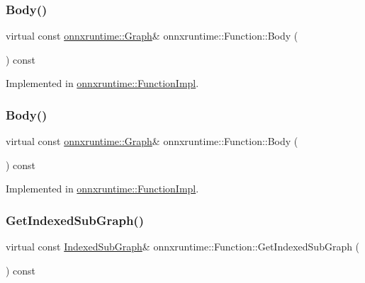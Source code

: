 \subsubsection{\texorpdfstring{Body()}{Body()}\hspace{0.1cm}{\footnotesize\ttfamily [1/2]}}
{\footnotesize\ttfamily virtual const \mbox{\hyperlink{classonnxruntime_1_1Graph}{onnxruntime\+::\+Graph}}\& onnxruntime\+::\+Function\+::\+Body (\begin{DoxyParamCaption}{ }\end{DoxyParamCaption}) const\hspace{0.3cm}{\ttfamily [pure virtual]}}



Implemented in \mbox{\hyperlink{classonnxruntime_1_1FunctionImpl_a151af57e5850f431b6aedba554153305}{onnxruntime\+::\+Function\+Impl}}.

\mbox{\label{classonnxruntime_1_1Function_a08b5712ccba430871c186da1c8670257}} 
\subsubsection{\texorpdfstring{Body()}{Body()}\hspace{0.1cm}{\footnotesize\ttfamily [2/2]}}
{\footnotesize\ttfamily virtual const \mbox{\hyperlink{classonnxruntime_1_1Graph}{onnxruntime\+::\+Graph}}\& onnxruntime\+::\+Function\+::\+Body (\begin{DoxyParamCaption}{ }\end{DoxyParamCaption}) const\hspace{0.3cm}{\ttfamily [pure virtual]}}



Implemented in \mbox{\hyperlink{classonnxruntime_1_1FunctionImpl_a151af57e5850f431b6aedba554153305}{onnxruntime\+::\+Function\+Impl}}.

\mbox{\label{classonnxruntime_1_1Function_a017f5155e74c32b1e3cd42e6c0f94d91}} 
\subsubsection{\texorpdfstring{Get\+Indexed\+Sub\+Graph()}{GetIndexedSubGraph()}\hspace{0.1cm}{\footnotesize\ttfamily [1/2]}}
{\footnotesize\ttfamily virtual const \mbox{\hyperlink{structonnxruntime_1_1IndexedSubGraph}{Indexed\+Sub\+Graph}}\& onnxruntime\+::\+Function\+::\+Get\+Indexed\+Sub\+Graph (\begin{DoxyParamCaption}{ }\end{DoxyParamCaption}) const\hspace{0.3cm}{\ttfamily [pure virtual]}}




